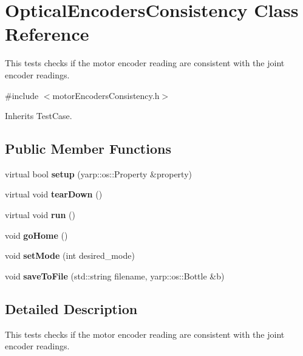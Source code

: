 \section{Optical\+Encoders\+Consistency Class Reference}
\label{classOpticalEncodersConsistency}


This tests checks if the motor encoder reading are consistent with the joint encoder readings.  




{\ttfamily \#include $<$motor\+Encoders\+Consistency.\+h$>$}



Inherits Test\+Case.

\subsection*{Public Member Functions}
\begin{DoxyCompactItemize}
\item 
\mbox{\label{classOpticalEncodersConsistency_a51df63f87479ffa4f2f05c99f9c06863}} 
virtual bool {\bfseries setup} (yarp\+::os\+::\+Property \&property)
\item 
\mbox{\label{classOpticalEncodersConsistency_a8751028fa2a3bb23acc51693f47a9b75}} 
virtual void {\bfseries tear\+Down} ()
\item 
\mbox{\label{classOpticalEncodersConsistency_a372d7c32a10225fcda5e6621c6494ad7}} 
virtual void {\bfseries run} ()
\item 
\mbox{\label{classOpticalEncodersConsistency_a1b18ff12291b46dddca9e0a11584887d}} 
void {\bfseries go\+Home} ()
\item 
\mbox{\label{classOpticalEncodersConsistency_ae1e7c3909700d9a39fe9dad1b4f5c9d5}} 
void {\bfseries set\+Mode} (int desired\+\_\+mode)
\item 
\mbox{\label{classOpticalEncodersConsistency_a7afe73617f00256e49c9a3c506f481a7}} 
void {\bfseries save\+To\+File} (std\+::string filename, yarp\+::os\+::\+Bottle \&b)
\end{DoxyCompactItemize}


\subsection{Detailed Description}
This tests checks if the motor encoder reading are consistent with the joint encoder readings. 

